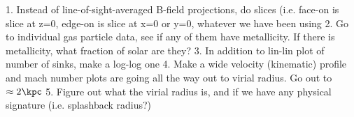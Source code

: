 1. Instead of line-of-sight-averaged B-field projections, do slices (i.e. face-on is slice at z=0, edge-on is slice at x=0 or y=0, whatever we have been using
2. Go to individual gas particle data, see if any of them have metallicity. If there is metallicity, what fraction of solar are they?
3. In addition to lin-lin plot of number of sinks, make a log-log one
4. Make a wide velocity (kinematic) profile and mach number plots are going all the way out to virial radius. Go out to $\approx 2 \kpc$
5. Figure out what the virial radius is, and if we have any physical signature (i.e. splashback radius?)


